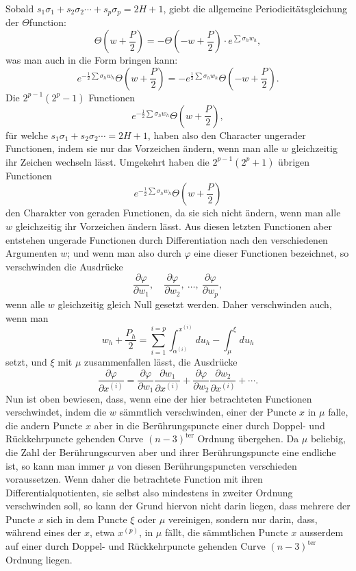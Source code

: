 \documentclass[10pt]{article}
\begin{document}
Sobald \(s_1\sigma_1+s_2\sigma_2\cdots+s_p\sigma_p=2H+1\), giebt die allgemeine Periodicitätsgleichung der \(\Theta\)function:
\[
\Theta\left(w+\frac P2\right)
=-\Theta\left(-w+\frac P2\right)\cdot e^{\sum\sigma_h w_h},
\]
was man auch in die Form bringen kann:
\[
e^{-\frac12\sum\sigma_h w_h}\Theta\left(w+\frac P2\right)
=
-e^{\frac12\sum\sigma_h w_h}\Theta\left(-w+\frac P2\right).
\]
Die \(2^{p-1}(2^p-1)\) Functionen
\[
e^{-\frac12\sum\sigma_h w_h}\Theta\left(w+\frac P2\right),
\]
für welche \(s_1\sigma_1+s_2\sigma_2\cdots=2H+1\), haben also den Character ungerader Functionen, indem sie nur das Vorzeichen ändern, wenn man alle \(w\) gleichzeitig ihr Zeichen wechseln lässt. Umgekehrt haben die \(2^{p-1}(2^p+1)\) übrigen Functionen
\[
e^{-\frac12\sum\sigma_h w_h}\Theta\left(w+\frac P2\right)
\]
den Charakter von geraden Functionen, da sie sich nicht ändern, wenn man alle \(w\) gleichzeitig ihr Vorzeichen ändern lässt. Aus diesen letzten Functionen aber entstehen ungerade Functionen durch Differentiation nach den verschiedenen Argumenten \(w\); und wenn man also durch \(\varphi\) eine dieser Functionen bezeichnet, so verschwinden die Ausdrücke
\[
\frac{\partial\varphi}{\partial w_1},\quad
\frac{\partial\varphi}{\partial w_2},\ \ldots,\ 
\frac{\partial\varphi}{\partial w_p},
\]
wenn alle \(w\) gleichzeitig gleich Null gesetzt werden. Daher verschwinden auch, wenn man
\[
w_h+\frac{P_h}{2}
=\sum_{i=1}^{i=p}\int_{\alpha^{(i)}}^{x^{(i)}}du_h-\int_{\mu}^{\xi}du_h
\]
setzt, und \(\xi\) mit \(\mu\) zusammenfallen lässt, die Ausdrücke
\[
\frac{\partial\varphi}{\partial x^{(i)}}
=
\frac{\partial\varphi}{\partial w_1}\frac{\partial w_1}{\partial x^{(i)}}
+
\frac{\partial\varphi}{\partial w_2}\frac{\partial w_2}{\partial x^{(i)}}+\cdots.
\]
Nun ist oben bewiesen, dass, wenn eine der hier betrachteten Functionen verschwindet, indem die \(w\) sämmtlich verschwinden, einer der Puncte \(x\) in \(\mu\) falle, die andern Puncte \(x\) aber in die Berührungspuncte einer durch Doppel- und Rückkehrpuncte gehenden Curve \((n-3)^{\text{ter}}\) Ordnung übergehen. Da \(\mu\) beliebig, die Zahl der Berührungscurven aber und ihrer Berührungspuncte eine endliche ist, so kann man immer \(\mu\) von diesen Berührungspuncten verschieden voraussetzen. Wenn daher die betrachtete Function mit ihren Differentialquotienten, sie selbst also mindestens in zweiter Ordnung verschwinden soll, so kann der Grund hiervon nicht darin liegen, dass mehrere der Puncte \(x\) sich in dem Puncte \(\xi\) oder \(\mu\) vereinigen, sondern nur darin, dass, während eines der \(x\), etwa \(x^{(p)}\), in \(\mu\) fällt, die sämmtlichen Puncte \(x\) ausserdem auf einer durch Doppel- und Rückkehrpuncte gehenden Curve \((n-3)^{\text{ter}}\) Ordnung liegen.
\end{document}
